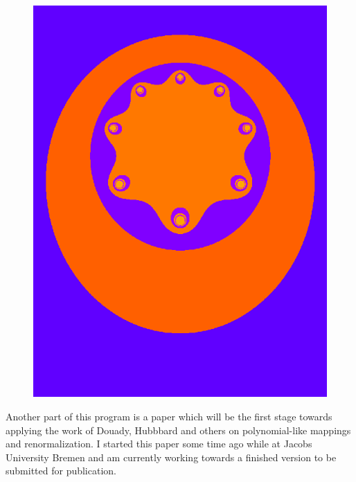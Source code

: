 \begin{figure}[ht]
  \begin{center}
    \includegraphics[width=\hsize]{Comerford/Figure23.png}
    \label{fig:profComerford}
   \end{center}
\end{figure}


Another part of this program is  a paper which will be the first stage towards
applying the work of Douady, Hubbbard and others on polynomial-like mappings
and renormalization. I started this paper some time ago while at Jacobs
University Bremen and am currently working towards a finished version to be
submitted for publication. 

